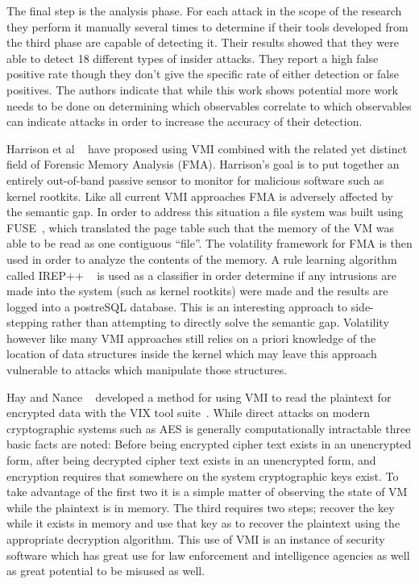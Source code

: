The final step is the analysis phase. For each attack in the scope of the research they perform it manually several times to determine if their tools developed from the third phase are capable of detecting it. Their results showed that they were able to detect 18 different types of insider attacks. They report a high false positive rate though they don’t give the specific rate of either detection or false positives. The authors indicate that while this work shows potential more work needs to be done on determining which observables correlate to which observables can indicate attacks in order to increase the accuracy of their detection. 

Harrison et al ~\cite{harrison_constructing_2012} have proposed using VMI combined with the related yet distinct field of Forensic Memory Analysis (FMA). Harrison’s goal is to put together an entirely out-of-band passive sensor to monitor for malicious software such as kernel rootkits. Like all current VMI approaches FMA is adversely affected by the semantic gap. In order to address this situation a file system was built using FUSE~\cite{rajgarhia_performance_2010}, which translated the page table such that the memory of the VM was able to be read as one contiguous “file”. The volatility framework for FMA is then used in order to analyze the contents of the memory. A rule learning algorithm called IREP++ ~\cite{dain_irep_2004} is used as a classifier in order determine if any intrusions are made into the system (such as kernel rootkits) were made and the results are logged into a postreSQL database. This is an interesting approach to side-stepping rather than attempting to directly solve the semantic gap. Volatility however like many VMI approaches still relies on a priori knowledge of the location of data structures inside the kernel which may leave this approach vulnerable to attacks which manipulate those structures. 

Hay and Nance ~\cite{hay_circumventing_2012} developed a method for using VMI to read the plaintext for encrypted data with the VIX tool suite~\cite{hay_forensics_2008}.  While direct attacks on modern cryptographic systems such as AES is generally computationally intractable three basic facts are noted: Before being encrypted cipher text exists in an unencrypted form, after being decrypted cipher text exists in an unencrypted form, and encryption requires that somewhere on the system cryptographic keys exist. To take advantage of the first two it is a simple matter of observing the state of VM while the plaintext is in memory.  The third requires two steps; recover the key while it exists in memory and use that key as to recover the plaintext using the appropriate decryption algorithm. This use of VMI is an instance of security software which has great use for law enforcement and intelligence agencies as well as great potential to be misused as well.

